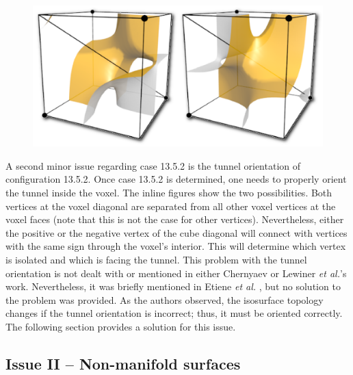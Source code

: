 \begin{figure}
     \includegraphics[width=\linewidth]{chapter4/figures/tunnel.png}
\end{figure}
A second minor issue regarding case 13.5.2 is the tunnel orientation of configuration 13.5.2. Once case 13.5.2 is determined, one needs to properly orient the tunnel inside the voxel. The inline figures show the two possibilities. Both vertices at the voxel diagonal are separated from all other voxel vertices at the voxel faces (note that this is not the case for other vertices). Nevertheless, either the positive or the negative vertex of the cube diagonal will connect with vertices with the same sign through the voxel's interior. This will determine which vertex is isolated and which is facing the tunnel. This problem with the tunnel orientation is not dealt with or mentioned in either Chernyaev or Lewiner \emph{et al.}'s work. Nevertheless, it was briefly mentioned in Etiene \emph{et al.} \cite{Etiene:2012:TVI:2197070.2197097}, but no solution to the problem was provided. As the authors observed, the isosurface topology changes if the tunnel orientation is incorrect; thus, it must be oriented correctly. The following section provides a solution for this issue.
%

\subsection{Issue II -- Non-manifold surfaces}
\label{sec:non-manifold-surfaces}

